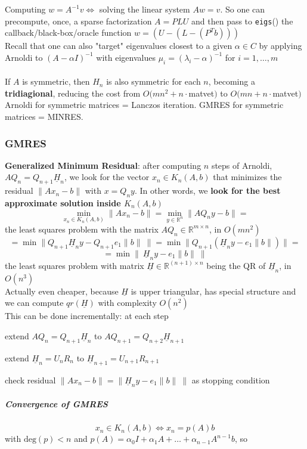 \documentclass[10pt]{report}
\begin{document}
Computing $w=A^{-1}v \Leftrightarrow$ solving the linear system $Aw=v$. So one can precompute, once, a sparse factorization $A=PLU$ and then pass to \texttt{eigs}() the callback/black-box/oracle function $w = (U-(L-(P^Tb)))$\\
Recall that one can also "target" eigenvalues closest to a given $\alpha\in C$ by applying Arnoldi to $(A-\alpha I)^{-1}$ with eigenvalues $\mu_i = (\lambda_i-\alpha)^{-1}$ for $i=1,\ldots,m$\\\\
If $A$ is symmetric, then $H_n$ is also symmetric for each $n$, becoming a \textbf{tridiagional}, reducing the cost from $O(mn^2+n\cdot$matvet$)$ to $O(mn+n\cdot$matvet$)$\\
Arnoldi for symmetric matrices = Lanczos iteration. GMRES for symmetric matrices = MINRES.
\subsubsection{GMRES} \textbf{Generalized Minimum Residual}: after computing $n$ steps of Arnoldi, $AQ_n = Q_{n+1}\underline{H}_n$, we look for the vector $x_n\in K_n(A,b)$ that minimizes the residual $\|Ax_n-b\|$ with $x = Q_ny$. In other words, we \textbf{look for the best approximate solution inside $K_n(A,b)$}
$$\min_{x_n\in K_n(A,b)}\|Ax_n-b\| = \min_{y\in \mathbb{R}^n} \|AQ_ny -b\|=$$ the least squares problem with the matrix $AQ_n\in \mathbb{R}^{m\times n}$, in $O(mn^2)$
$$=\min\|Q_{n+1}\underline{H}_ny-Q_{n+1}e_1\|b\|\:\|=\min\|Q_{n+1}\left(\underline{H}_ny-e_1\|b\|\right)\|=$$
$$= \min\|\:\underline{H}_n y - e_1\|b\|\:\|$$ the least squares problem with matrix $\underline{H}\in \mathbb{R}^{(n+1)\times n}$ being the QR of $\underline{H}_n$, in $O(n^3)$\\
Actually even cheaper, because $\underline{H}$ is upper triangular, has special structure and we can compute $qr(\underline{H})$ with complexity $O(n^2)$\\
This can be done incrementally: at each step
\begin{list}{}{}
	\item extend $AQ_n=Q_{n+1}\underline{H}_n$ to $AQ_{n+1} = Q_{n+2}\underline{H}_{n+1}$
	\item extend $\underline{H}_n = U_nR_n$ to $\underline{H}_{n+1}=U_{n+1}R_{n+1}$
	\item check residual $\|Ax_n-b\|=\|\underline{H}_ny-e_1\|b\|\:\|$ as stopping condition
\end{list}
\subparagraph{Convergence of GMRES} $$x_n\in K_n(A,b)\Leftrightarrow x_n = p(A)b$$ with $\text{deg}(p)<n$ and $p(A) = \alpha_0 I + \alpha_1 A + \ldots + \alpha_{n-1}A^{n-1}b$, so
\end{document}

